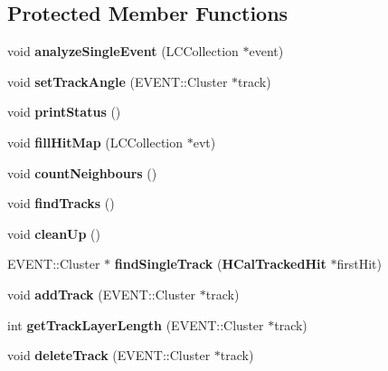 \subsection*{Protected Member Functions}
\begin{DoxyCompactItemize}
\item 
void {\bf analyze\-Single\-Event} (L\-C\-Collection $\ast$event)
\item 
void {\bfseries set\-Track\-Angle} (E\-V\-E\-N\-T\-::\-Cluster $\ast$track)\label{classHCalTrackingNNProcessor_ac0c71ddc6d42d008977164cbc7a630ca}

\item 
void {\bfseries print\-Status} ()\label{classHCalTrackingNNProcessor_acbc06acf8aa197f8f08564e9c8737488}

\item 
void {\bfseries fill\-Hit\-Map} (L\-C\-Collection $\ast$evt)\label{classHCalTrackingNNProcessor_a26b8b7800790dc7c92f91e760e65060f}

\item 
void {\bfseries count\-Neighbours} ()\label{classHCalTrackingNNProcessor_a5982d56f68096926ba9ffafdba6492d6}

\item 
void {\bfseries find\-Tracks} ()\label{classHCalTrackingNNProcessor_a5616071406e2c134b27708eb8ce79406}

\item 
void {\bfseries clean\-Up} ()\label{classHCalTrackingNNProcessor_a81b64e667dfb82fd618483e7622c1e54}

\item 
E\-V\-E\-N\-T\-::\-Cluster $\ast$ {\bfseries find\-Single\-Track} ({\bf H\-Cal\-Tracked\-Hit} $\ast$first\-Hit)\label{classHCalTrackingNNProcessor_a2d1fa550dd88bd44d8eba2e60e865233}

\item 
void {\bfseries add\-Track} (E\-V\-E\-N\-T\-::\-Cluster $\ast$track)\label{classHCalTrackingNNProcessor_af2f77e426981c935018fdbdeb70ebe78}

\item 
int {\bfseries get\-Track\-Layer\-Length} (E\-V\-E\-N\-T\-::\-Cluster $\ast$track)\label{classHCalTrackingNNProcessor_adfa6baef7083471ec1bd9d9eb224a825}

\item 
void {\bfseries delete\-Track} (E\-V\-E\-N\-T\-::\-Cluster $\ast$track)\label{classHCalTrackingNNProcessor_a51dd0aca10d6d787fb5d587e2169cb28}

\end{DoxyCompactItemize}
